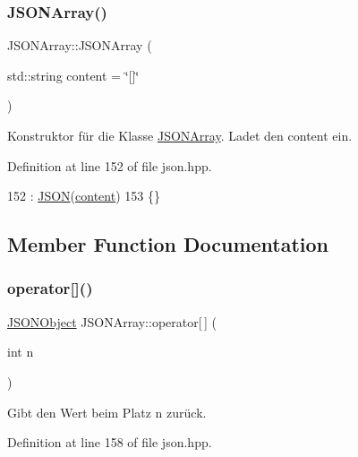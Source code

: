 \subsubsection{\texorpdfstring{J\+S\+O\+N\+Array()}{JSONArray()}}
{\footnotesize\ttfamily J\+S\+O\+N\+Array\+::\+J\+S\+O\+N\+Array (\begin{DoxyParamCaption}\item[{std\+::string}]{content = {\ttfamily \char`\"{}\mbox{[}\mbox{]}\char`\"{}} }\end{DoxyParamCaption})\hspace{0.3cm}{\ttfamily [inline]}}

Konstruktor für die Klasse \mbox{\hyperlink{class_j_s_o_n_array}{J\+S\+O\+N\+Array}}. Ladet den {\ttfamily content} ein. 

Definition at line 152 of file json.\+hpp.


\begin{DoxyCode}
152                                               : \mbox{\hyperlink{class_j_s_o_n_ae9b8a305b1bdc0aa66d096b226e1d7bb}{JSON}}(\mbox{\hyperlink{class_j_s_o_n_ad1ace77234b963a2994178ce7f76a181}{content}})
153 \{\}
\end{DoxyCode}


\subsection{Member Function Documentation}
\mbox{\label{class_j_s_o_n_array_a8c2bac974ee9b2806e9dbb78062f3abd}} 
\subsubsection{\texorpdfstring{operator[]()}{operator[]()}}
{\footnotesize\ttfamily \mbox{\hyperlink{class_j_s_o_n_object}{J\+S\+O\+N\+Object}} J\+S\+O\+N\+Array\+::operator\mbox{[}$\,$\mbox{]} (\begin{DoxyParamCaption}\item[{int}]{n }\end{DoxyParamCaption})\hspace{0.3cm}{\ttfamily [inline]}}

Gibt den Wert beim Platz n zurück. 

Definition at line 158 of file json.\+hpp.



